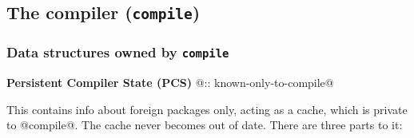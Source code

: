 \documentclass[11pt]{article}
\begin{document}
\subsection{The compiler (\mbox{\tt compile})}
\label{sec:compiler}

\subsubsection{Data structures owned by \mbox{\tt compile}}

{\bf Persistent Compiler State (PCS)} @:: known-only-to-compile@

This contains info about foreign packages only, acting as a cache,
which is private to @compile@.  The cache never becomes out of
date.  There are three parts to it:
\end{document}
